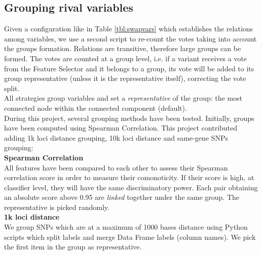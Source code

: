 
\subsection{Grouping rival variables}
Given a configuration like in Table \ref{tbl:swapvars} which establishes the relations among variables, we use a second script to re-count the votes taking into account the groups formation. Relations are transitive, therefore large groups can be formed. The votes are counted at a group level, i.e. if a variant receives a vote from the Feature Selector and it belongs to a group, its vote will be added to its group representative (unless it is the representative itself), correcting the vote split. 
\\

All strategies group variables and set a \textit{representative} of the group: the most connected node within the connected component (default).
\\

During this project, several grouping methods have been tested. Initially, groups have been computed using Spearman Correlation. This project contributed adding 1k loci distance grouping, 10k loci distance and same-gene SNPs grouping:
\\

\textbf{Spearman Correlation}\\
All features have been compared to each other to assess their Spearman correlation score in order to measure their comonoticity. If their score is high, at classifier level, they will have the same discriminatory power. Each pair obtaining an absolute score above 0.95 are \emph{linked} together under the same group. The representative is picked randomly.
\\

\textbf{1k loci distance}\\
We group SNPs which are at a maximum of 1000 bases distance using Python scripts which split labels and merge Data Frame labels (column names). We pick the first item in the group as representative.
\\

